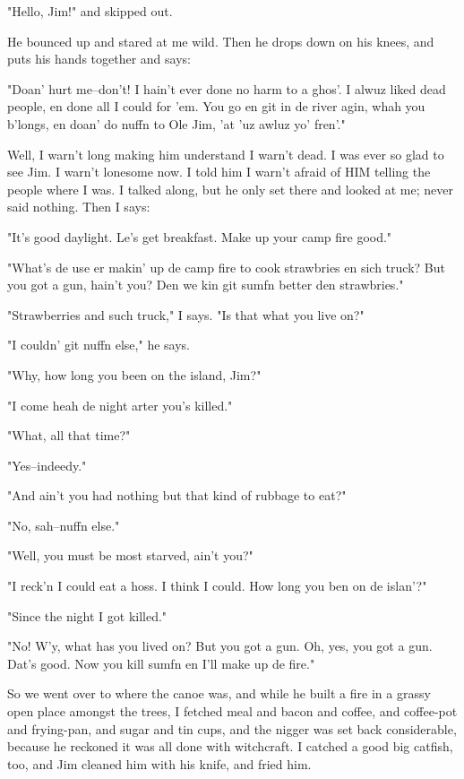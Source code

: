 "Hello, Jim!" and skipped out.

He bounced up and stared at me wild.  Then he drops down on his knees,
and puts his hands together and says:

"Doan' hurt me--don't!  I hain't ever done no harm to a ghos'.  I alwuz
liked dead people, en done all I could for 'em.  You go en git in de
river agin, whah you b'longs, en doan' do nuffn to Ole Jim, 'at 'uz awluz
yo' fren'."

Well, I warn't long making him understand I warn't dead.  I was ever so
glad to see Jim.  I warn't lonesome now.  I told him I warn't afraid of
HIM telling the people where I was.  I talked along, but he only set
there and looked at me; never said nothing.  Then I says:

"It's good daylight.  Le's get breakfast.  Make up your camp fire good."

"What's de use er makin' up de camp fire to cook strawbries en sich
truck? But you got a gun, hain't you?  Den we kin git sumfn better den
strawbries."

"Strawberries and such truck," I says.  "Is that what you live on?"

"I couldn' git nuffn else," he says.

"Why, how long you been on the island, Jim?"

"I come heah de night arter you's killed."

"What, all that time?"

"Yes--indeedy."

"And ain't you had nothing but that kind of rubbage to eat?"

"No, sah--nuffn else."

"Well, you must be most starved, ain't you?"

"I reck'n I could eat a hoss.  I think I could. How long you ben on de
islan'?"

"Since the night I got killed."

"No!  W'y, what has you lived on?  But you got a gun.  Oh, yes, you got a
gun.  Dat's good.  Now you kill sumfn en I'll make up de fire."

So we went over to where the canoe was, and while he built a fire in a
grassy open place amongst the trees, I fetched meal and bacon and coffee,
and coffee-pot and frying-pan, and sugar and tin cups, and the nigger was
set back considerable, because he reckoned it was all done with
witchcraft. I catched a good big catfish, too, and Jim cleaned him with
his knife, and fried him.

